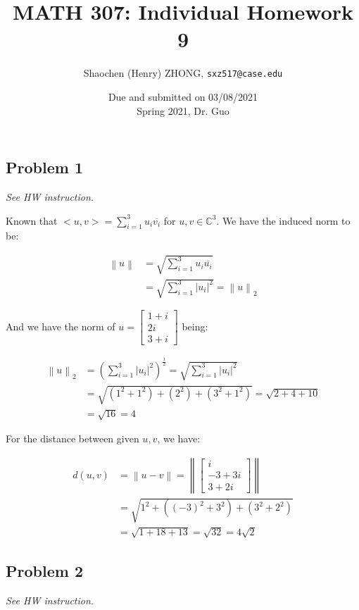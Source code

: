 \documentclass[11pt]{article}
\newcommand{\ilc}{\texttt}
\providecommand{\qbm}[1]{\begin{bmatrix} #1 \end{bmatrix}}
\providecommand{\norm}[1]{\left\lVert #1 \right\rVert}
\providecommand{\len}[1]{\left| #1 \right|}
\begin{document}
\title{\textbf{MATH 307: Individual Homework 9}}


\author{Shaochen (Henry) ZHONG, \ilc{sxz517@case.edu}}

\date{Due and submitted on 03/08/2021 \\ Spring 2021, Dr. Guo}
\maketitle



\subsection*{Problem 1}
\textit{See HW instruction.}\newline

Known that $<u, v> = \sum\limits_{i=1}^{3} u_i \overline{v_i}$ for $u, v \in \mathbb{C}^3$. We have the induced norm to be:

\begin{align*}
    \norm{u} &= \sqrt{\sum\limits_{i=1}^{3} u_i \overline{u_i}} \\
    &= \sqrt{\sum\limits_{i=1}^{3} \len{u_i}^2} = \norm{u}_2
\end{align*}

And we have the norm of $u = \qbm{1+i \\ 2i \\ 3+i}$ being:

\begin{align*}
    \norm{u}_2 &= (\sum\limits_{i=1}^{3} \len{u_i}^2)^{\frac{1}{2}} = \sqrt{\sum\limits_{i=1}^{3} \len{u_i}^2} \\
    &= \sqrt{(1^2 + 1^2) + (2^2) + (3^2 + 1^2)} = \sqrt{2 + 4 + 10} \\
    &= \sqrt{16} = 4
\end{align*}

For the distance between given $u, v$, we have:

\begin{align*}
    d(u, v) &= \norm{u - v} = \norm{\qbm{i \\ -3 + 3i \\ 3 + 2i}} \\
    &= \sqrt{1^2 + ((-3)^2 + 3^2) + (3^2 + 2^2)} \\
    &= \sqrt{1 + 18 + 13} = \sqrt{32} = 4\sqrt{2}
\end{align*}

\subsection*{Problem 2}
\textit{See HW instruction.}\newline
\end{document}
